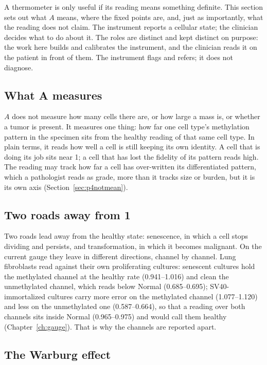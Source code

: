 A thermometer is only useful if its reading means something definite. This section sets out what $A$ means, where the fixed points are,
and, just as importantly, what the reading does not claim. The instrument reports a cellular state; the clinician decides what to do
about it. The roles are distinct and kept distinct on purpose: the work here builds and calibrates the instrument, and the clinician reads
it on the patient in front of them. The instrument flags and refers; it does not diagnose.

\subsection{What A measures}

$A$ does not measure how many cells there are, or how large a mass is, or whether a tumor is present. It measures one thing: how far one
cell type's methylation pattern in the specimen sits from the healthy reading of that same cell type. In plain terms, it reads how well a
cell is still keeping its own identity. A cell that is doing its job sits near 1; a cell that has lost the fidelity of its pattern reads
high. The reading may track how far a cell has over-written its differentiated pattern, which a pathologist reads as grade, more than it tracks
size or burden, but it is its own axis (Section~\ref{sec:p4notmean}). \conjecture

\subsection{Two roads away from 1}

Two roads lead away from the healthy state: senescence, in which a cell stops dividing and persists, and transformation, in which it
becomes malignant. On the current gauge they leave in different directions, channel by channel. Lung fibroblasts read against their own
proliferating cultures: senescent cultures hold the methylated channel at the healthy rate (0.941--1.016) and clean the unmethylated
channel, which reads below Normal (0.685--0.695); SV40-immortalized cultures carry more error on the methylated channel (1.077--1.120) and
less on the unmethylated one (0.587--0.664), so that a reading over both channels sits inside Normal (0.965--0.975) and would call them
healthy (Chapter~\ref{ch:gauge}). \measured{} That is why the channels are reported apart.

\subsection{The Warburg effect}

